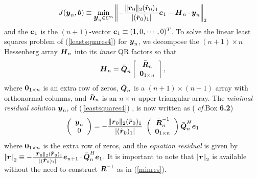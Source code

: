 \begin{equation} \label{leastsquares4}
J({\bmi  y}_{n},{\bmi  b}) \equiv  \min_{{\bmi  y}_{n}\in C^{n}} 
\left|\!\left|
 -\frac{ \| {\bmi  r}{}_{0} \|_{2}
(\hat{\bmi  r}_{0})_1}{ |(\hat{\bmi  r}_{0})_1|} {\bmi  e}_{1}-{\bmi 
H}_{n}\cdot{\bmi  y}_{n}
\right|\!\right|_{2}
\end{equation}
and the ${\bmi  e}_{1}$
is the $(n+1)$-vector ${\bmi  e}_{1}\equiv (1,0,\cdots,0)^{T}$.
To solve the linear least squares problem of (\ref{leastsquares4}) for
${\bmi  y}_{n}$, we decompose the   $(n+1)\times n$ Hessenberg array 
${\bmi  H}_{n}$
into its {\em inner\/} QR factors so that 
\[{\bmi  H}_{n}=\bar{\bmi  
Q}_{n}\left[\begin{array}{c} \bar{\bmi  R}_{n}\\ {\bf 0}_{1 \times n} 
\end{array}\right], 
\]
where ${\bf 0}_{1 \times n}$ is an extra row of zeros, 
$\bar{\bmi  Q}_{n}$ is a $(n+1)\times (n+1)$ array with orthonormal 
columns, and 
$\bar{\bmi  R}_{n}$
is an $n\times n$ upper triangular array. The {\em minimal residual 
solution \/}
${\bmi  y}_{n}$, of (\ref{leastsquares4}) , is now written as ({\em 
cf.\/}{\sc Box} {\bf 6.2})
\begin{equation} \label{minres} 
\left( \begin{array}{c}{\bmi  y}_{n}\\ 
0\end{array} \right)
=  -\frac{ \| {\bmi  r}{}_{0} \|_{2}
(\hat{\bmi  r}_{0})_1}{ |(\hat{\bmi  r}_{0})_1|} \ \left( 
\begin{array}{c}\bar{\bmi  R}_{n}^{-1}\\ 
{\bf 0}_{1 \times n}\end{array} \right)\bar{\bmi  Q}_{n}^{H}{\bmi  e}_{1}
\end{equation}
where  ${\bf 0}_{1 \times n}$   is the extra row of zeros, and the {\em 
equation 
residual\/} is given by
$\left|\!\left|{\bmi  r}\right|\!\right|_{2}\equiv  -\frac{ \| {\bmi  
r}{}_{0} \|_{2}
(\hat{\bmi  r}_{0})_1}{ |(\hat{\bmi  r}_{0})_1|} 
{\bmi  e}_{n+1}\cdot\bar{\bmi  Q}_{n}^{H}{\bmi  e}_{1}$. It is important 
to note 
that $\left|\!\left|{\bmi  r}\right|\!\right|_{2}$ is available without 
the 
need to construct  ${\bmi  R}^{-1}$ as in (\ref{minres}).



